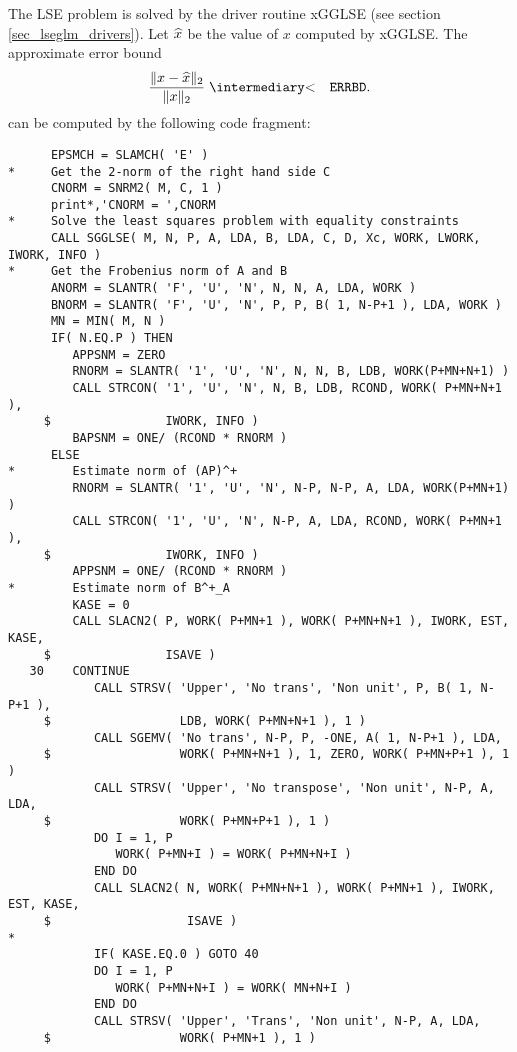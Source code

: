 \noindent
The LSE problem is solved by the driver routine xGGLSE
(see section \ref{sec_lseglm_drivers}).
Let $\widehat{x}$ be the value of $x$ computed by xGGLSE.
The approximate error bound
\begin{eqnarray*}
     \frac{ \| x - \ha{x} \|_2 }{ \| x \|_2 } & \lapproxeq & {\tt ERRBD} . \\
\end{eqnarray*}
can be computed by the following code fragment:

{\small
\begin{verbatim}
      EPSMCH = SLAMCH( 'E' )
*     Get the 2-norm of the right hand side C
      CNORM = SNRM2( M, C, 1 )
      print*,'CNORM = ',CNORM
*     Solve the least squares problem with equality constraints
      CALL SGGLSE( M, N, P, A, LDA, B, LDA, C, D, Xc, WORK, LWORK, IWORK, INFO )
*     Get the Frobenius norm of A and B
      ANORM = SLANTR( 'F', 'U', 'N', N, N, A, LDA, WORK )
      BNORM = SLANTR( 'F', 'U', 'N', P, P, B( 1, N-P+1 ), LDA, WORK )
      MN = MIN( M, N )
      IF( N.EQ.P ) THEN
         APPSNM = ZERO
         RNORM = SLANTR( '1', 'U', 'N', N, N, B, LDB, WORK(P+MN+N+1) )
         CALL STRCON( '1', 'U', 'N', N, B, LDB, RCOND, WORK( P+MN+N+1 ),
     $                IWORK, INFO )
         BAPSNM = ONE/ (RCOND * RNORM )
      ELSE
*        Estimate norm of (AP)^+
         RNORM = SLANTR( '1', 'U', 'N', N-P, N-P, A, LDA, WORK(P+MN+1) )
         CALL STRCON( '1', 'U', 'N', N-P, A, LDA, RCOND, WORK( P+MN+1 ),
     $                IWORK, INFO )
         APPSNM = ONE/ (RCOND * RNORM )
*        Estimate norm of B^+_A
         KASE = 0
         CALL SLACN2( P, WORK( P+MN+1 ), WORK( P+MN+N+1 ), IWORK, EST, KASE,
     $                ISAVE )
   30    CONTINUE
            CALL STRSV( 'Upper', 'No trans', 'Non unit', P, B( 1, N-P+1 ),
     $                  LDB, WORK( P+MN+N+1 ), 1 )
            CALL SGEMV( 'No trans', N-P, P, -ONE, A( 1, N-P+1 ), LDA,
     $                  WORK( P+MN+N+1 ), 1, ZERO, WORK( P+MN+P+1 ), 1 )
            CALL STRSV( 'Upper', 'No transpose', 'Non unit', N-P, A, LDA,
     $                  WORK( P+MN+P+1 ), 1 )
            DO I = 1, P
               WORK( P+MN+I ) = WORK( P+MN+N+I )
            END DO
            CALL SLACN2( N, WORK( P+MN+N+1 ), WORK( P+MN+1 ), IWORK, EST, KASE,
     $                   ISAVE )
*
            IF( KASE.EQ.0 ) GOTO 40
            DO I = 1, P
               WORK( P+MN+N+I ) = WORK( MN+N+I )
            END DO
            CALL STRSV( 'Upper', 'Trans', 'Non unit', N-P, A, LDA,
     $                  WORK( P+MN+1 ), 1 )

\end{verbatim}}
